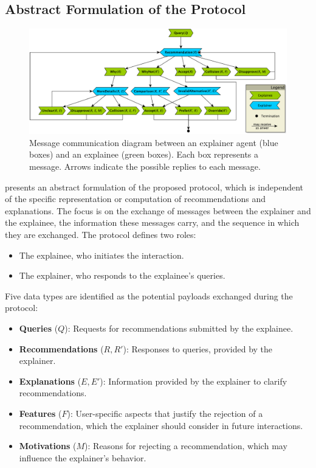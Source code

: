 \subsection{Abstract Formulation of the Protocol}
\label{subsec:abstract-formulation-of-the-protocol}
%
\begin{figure}
    \centering
    \includegraphics[width=\linewidth]{figures/pyxmas/user-agent-protocol}
    \caption[Message communication diagram between an explainer agent and an explainee]{%
      Message communication diagram between an explainer agent (blue boxes) and an explainee (green boxes).
      Each box represents a message.
      Arrows indicate the possible replies to each message.
    }
    \label{fig:protocol-messages}
\end{figure}
%
 presents an abstract formulation of the proposed protocol, which is independent of the specific representation or computation of recommendations and explanations.
%
The focus is on the exchange of messages between the explainer and the explainee, the information these messages carry, and the sequence in which they are exchanged.
%
The protocol defines two roles:
%
\begin{itemize}
    \item The explainee, who initiates the interaction.
    \item The explainer, who responds to the explainee's queries.
\end{itemize}
%
Five data types are identified as the potential payloads exchanged during the protocol:
%
\begin{itemize}
    \item \textbf{Queries} (\(Q\)): Requests for recommendations submitted by the explainee.
    \item \textbf{Recommendations} (\(R, R'\)): Responses to queries, provided by the explainer.
    \item \textbf{Explanations} (\(E, E'\)): Information provided by the explainer to clarify recommendations.
    \item \textbf{Features} (\(F\)): User-specific aspects that justify the rejection of a recommendation, which the explainer should consider in future interactions.
    \item \textbf{Motivations} (\(M\)): Reasons for rejecting a recommendation, which may influence the explainer's behavior.
\end{itemize}
